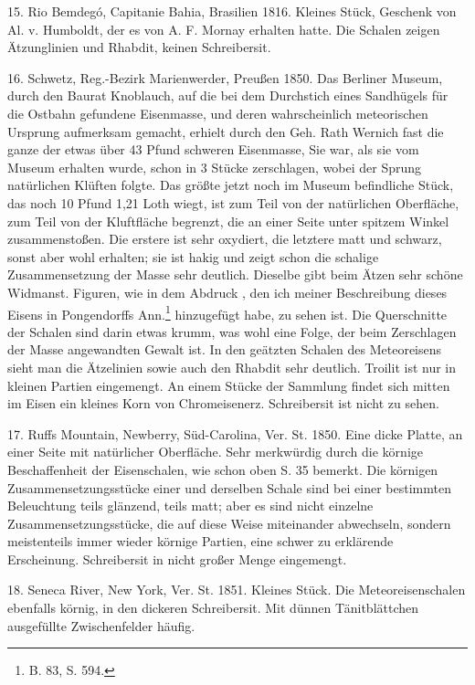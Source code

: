 \documentclass[a4paper, 11pt, oneside]{article}
\begin{document}
15. Rio Bemdegó, Capitanie Bahia, Brasilien 1816. Kleines Stück, Geschenk von Al. v. Humboldt, der es von A. F. Mornay erhalten hatte. Die Schalen zeigen Ätzunglinien und Rhabdit, keinen Schreibersit.

16. Schwetz, Reg.-Bezirk Marienwerder, Preußen 1850. Das Berliner Museum, durch den Baurat Knoblauch, auf die bei dem Durchstich eines Sandhügels für die Ostbahn gefundene Eisenmasse, und deren wahrscheinlich meteorischen Ursprung aufmerksam gemacht, erhielt durch den Geh. Rath Wernich fast die ganze der etwas über 43 Pfund schweren Eisenmasse, Sie war, als sie vom Museum erhalten wurde, schon in 3 Stücke zerschlagen, wobei der Sprung natürlichen Klüften folgte. Das größte jetzt noch im Museum befindliche Stück, das noch 10 Pfund 1,21 Loth wiegt, ist zum Teil von der natürlichen Oberfläche, zum Teil von der Kluftfläche begrenzt, die an einer Seite unter spitzem Winkel zusammenstoßen. Die erstere ist sehr oxydiert, die letztere matt und schwarz, sonst aber wohl erhalten; sie ist hakig und zeigt schon die schalige Zusammensetzung der Masse sehr deutlich. Dieselbe gibt beim Ätzen sehr schöne Widmanst. Figuren, wie in dem Abdruck , den ich meiner Beschreibung dieses Eisens in Pongendorffs Ann.\footnote{B. 83, S. 594.} hinzugefügt habe, zu sehen ist. Die Querschnitte der Schalen sind darin etwas krumm, was wohl eine Folge, der beim Zerschlagen der Masse angewandten Gewalt ist. In den geätzten Schalen des Meteoreisens sieht man die Ätzelinien sowie auch den Rhabdit sehr deutlich. Troilit ist nur in kleinen Partien eingemengt. An einem Stücke der Sammlung findet sich mitten im Eisen ein kleines Korn von Chromeisenerz. Schreibersit ist nicht zu sehen.

17. Ruffs Mountain, Newberry, Süd-Carolina, Ver. St. 1850. Eine dicke Platte, an einer Seite mit natürlicher Oberfläche. Sehr merkwürdig durch die körnige Beschaffenheit der Eisenschalen, wie schon oben S. 35 bemerkt. Die körnigen Zusammensetzungsstücke einer und derselben Schale sind bei einer bestimmten Beleuchtung teils glänzend, teils matt; aber es sind nicht einzelne Zusammensetzungsstücke, die auf diese Weise miteinander abwechseln, sondern meistenteils immer wieder körnige Partien, eine schwer zu erklärende Erscheinung. Schreibersit in nicht großer Menge eingemengt.

18. Seneca River, New York, Ver. St. 1851. Kleines Stück. Die Meteoreisenschalen ebenfalls körnig, in den dickeren Schreibersit. Mit dünnen Tänitblättchen ausgefüllte Zwischenfelder häufig.
\end{document}
